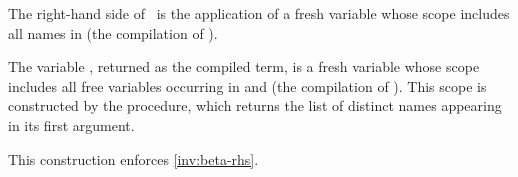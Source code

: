 The right-hand side of \linkbeta\ is the application of a fresh
variable  whose scope includes all names in  (the
compilation of ).

The variable , returned as the compiled term, is a fresh
variable whose scope includes all free variables occurring in
 and  (the compilation of ). This scope
is constructed by the  procedure, which returns the
list of distinct names appearing in its first argument.

This construction enforces \cref{inv:beta-rhs}.







